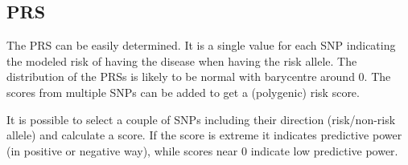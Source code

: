 \documentclass[letterpaper, 11pt]{article}
\begin{document}
\subsection{PRS}
The PRS can be easily determined. It is a single value for each SNP indicating the modeled risk of having the disease when having the risk allele. The distribution of the PRSs is likely to be normal with barycentre around 0. The scores from multiple SNPs can be added to get a (polygenic) risk score. 
\begin{figure} [!h] \end{figure}

It is possible to select a couple of SNPs including their direction (risk/non-risk allele) and calculate a score. If the score is extreme it indicates predictive power (in positive or negative way), while scores near 0 indicate low predictive power.\\
\end{document}
